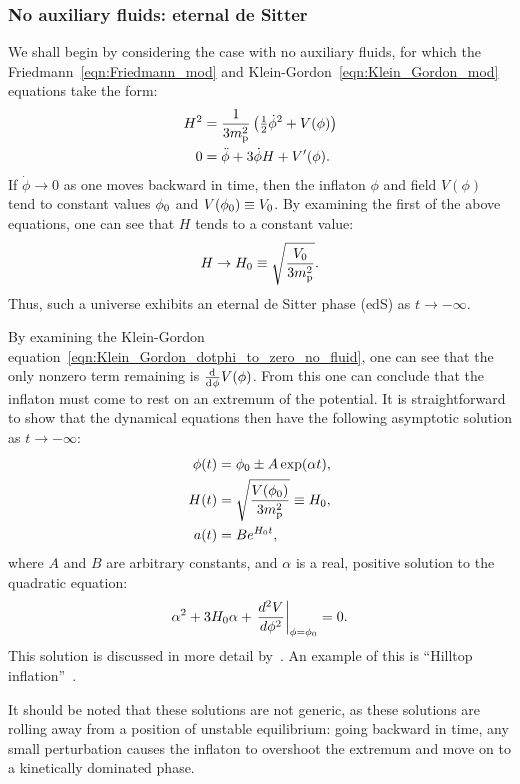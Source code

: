 \subsubsection{No auxiliary fluids: eternal de Sitter}
We shall begin by considering the case with no auxiliary fluids, for which the Friedmann~\eqref{eqn:Friedmann_mod} and Klein-Gordon~\eqref{eqn:Klein_Gordon_mod} equations take the form:
%
\begin{align}
  H^2 
  &=
  \frac{1}{3m_{\mathrm{p}}^2}\left({\textstyle\frac{1}{2}}\dot{\phi}^2 + V(\phi) \right)
  \label{eqn:Friedmann_dotphi_to_zero_no_fluid} 
  \\
  0
  &=
  \ddot{\phi} +3\dot{\phi}H + V^\prime(\phi).
  \label{eqn:Klein_Gordon_dotphi_to_zero_no_fluid}
\end{align}
%
If \(\dot{\phi}\to 0\) as one moves backward in time, then the inflaton \(\phi\) and field \(V(\phi)\) tend to constant values \(\phi_0\) and \(V(\phi_0)\equiv V_0\). By examining the first of the above equations, one can see that \(H\) tends to a constant value:
%
\begin{equation}
  H\to H_0 \equiv \sqrt{\frac{V_0}{3m_{\mathrm{p}}^2}}.
\end{equation}
%
Thus, such a universe exhibits an eternal de Sitter phase (edS) as \(t\to-\infty\).

By examining the Klein-Gordon equation~\eqref{eqn:Klein_Gordon_dotphi_to_zero_no_fluid}, one can see that the only nonzero term remaining is \(\frac{\operatorname{d}^{}\!{}}{\operatorname{d}^{}\!{\phi}}V(\phi)\). From this one can conclude that the inflaton must come to rest on an extremum of the potential. It is straightforward to show that the dynamical equations then have the following asymptotic solution as \(t \to -\infty\):
%
\begin{align}
  \phi(t)
  &=
  \phi_0 \pm A \exp(\alpha t),\\
  H(t)
  &=
  \sqrt{\frac{V(\phi_0)}{3m_{\mathrm{p}}^2}} \equiv H_0,\\
  a(t)
  &=
  B e^{H_0t},
\end{align}
%
where \(A\) and \(B\)  are arbitrary constants, and \(\alpha\) is a real, positive solution to the quadratic equation:
% 
%
\begin{equation}
  \alpha^2 + 3H_0\alpha + \left.
  \frac{{d^2}V}{{d}\phi^2}\right|_{\phi=\phi_0}=0.
\end{equation}
%
This solution is discussed in more detail by~\cite{destri_preinflationary_2010}. An example of this is ``Hilltop inflation''~\citep{linde_1982,albrecht_1982}. 

It should be noted that these solutions are not generic, as these solutions are rolling away from a position of unstable equilibrium: going backward in time, any small perturbation causes the inflaton to overshoot the extremum and move on to a kinetically dominated phase.

